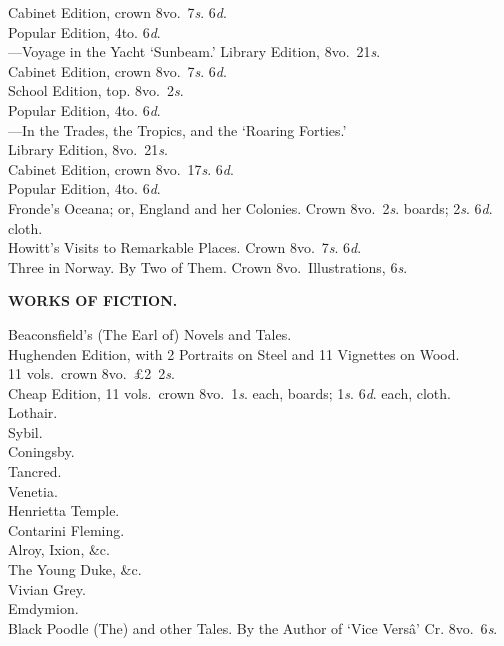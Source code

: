 \documentclass[letterpaper,12pt,oneside,openany]{memoir}
\newcommand{\D}{\hspace*{5mm}}
\newcommand{\E}{\hspace*{2mm}---\hspace*{2mm}}
\begin{document}
\begin{footnotesize}
\D \D Cabinet Edition, crown 8vo.\ 7\textit{s}. 6\textit{d}. \\
\D \D Popular Edition, 4to. 6\textit{d}.\\
\E Voyage in the Yacht `Sunbeam.' Library Edition, 8vo.\ 21\textit{s}. \\
\D \D Cabinet Edition, crown 8vo.\ 7\textit{s}. 6\textit{d}. \\
\D \D School Edition, top. 8vo.\ 2\textit{s}. \\
\D \D Popular Edition, 4to. 6\textit{d}.\\
\E In the Trades, the Tropics, and the `Roaring Forties.' \\
\D \D Library Edition, 8vo.\ 21\textit{s}. \\
\D \D Cabinet Edition, crown 8vo.\ 17\textit{s}. 6\textit{d}. \\
\D \D Popular Edition, 4to. 6\textit{d}.\\
Fronde's Oceana; or, England and her Colonies. Crown 8vo.\ 2\textit{s}. boards; 2\textit{s}. 6\textit{d}. cloth.\\
Howitt's Visits to Remarkable Places. Crown 8vo.\ 7\textit{s}. 6\textit{d}.\\
Three in Norway. By Two of Them. Crown 8vo.\ Illustrations, 6\textit{s}.
\begin{center}
\textbf{WORKS OF FICTION.}
\end{center}
Beaconsfield's (The Earl of) Novels and Tales. \\
\D Hughenden Edition, with 2 Portraits on Steel and 11 Vignettes on Wood. \\
\D\D 11 vols.\ crown 8vo.\ \pounds2\ 2\textit{s}.\\
\D Cheap Edition, 11 vols.\ crown 8vo.\ 1\textit{s}. each, boards; 1\textit{s}. 6\textit{d}. each, cloth.\\
\D Lothair.\\
\D Sybil.\\
\D Coningsby.\\
\D Tancred.\\
\D Venetia.\\
\D Henrietta Temple.\\
\D Contarini Fleming.\\
\D Alroy, Ixion, \&c.\\
\D The Young Duke, \&c.\\
\D Vivian Grey.\\
\D Emdymion.\\
Black Poodle (The) and other Tales. By the Author of `Vice Vers{\^a}' Cr. 8vo.\ 6\textit{s}.\\

\end{footnotesize}
\end{document}
